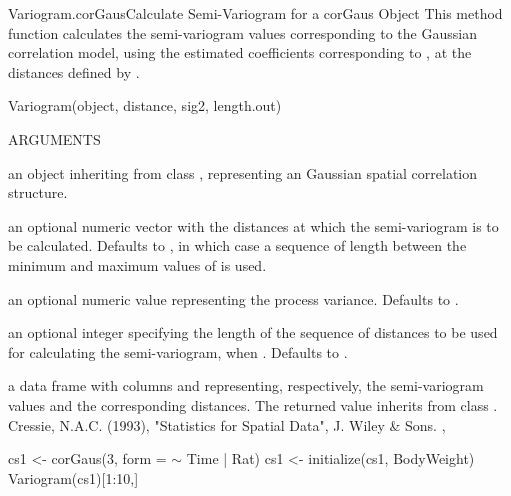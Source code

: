 \documentclass[pdftex]{article} \usepackage{url,graphicx}
\renewcommand{\Twiddle}{\mbox{\(\sim\)}}
\begin{document}
\begin{Helpfile}{Variogram.corGaus}{Calculate Semi-Variogram for a corGaus Object}
This method function calculates the semi-variogram values
corresponding to the Gaussian correlation model, using the estimated
coefficients corresponding to , at the distances defined
by .
\begin{Example}
Variogram(object, distance, sig2, length.out)
\end{Example}
\begin{Argument}{ARGUMENTS}
\item[\Co{object:}]
an object inheriting from class ,
representing an Gaussian spatial correlation structure.
\item[\Co{distance:}]
an optional numeric vector with the distances at
which the semi-variogram is to be calculated. Defaults to
, in which case a sequence of length 
between the minimum and maximum values of
 is used.
\item[\Co{sig2:}]
an optional numeric value representing the process
variance. Defaults to .
\item[\Co{length.out:}]
an optional integer specifying the length of the
sequence of distances to be used for calculating the semi-variogram,
when . Defaults to .
\end{Argument}
a data frame with columns  and  representing,
respectively, the semi-variogram values and the corresponding
distances. The returned value inherits from class .
Cressie, N.A.C. (1993), "Statistics for Spatial Data", J. Wiley \& Sons.
, 
\need 15pt
\vspace{-16pt}
\begin{Example}
cs1 <- corGaus(3, form = {\Twiddle} Time | Rat)
cs1 <- initialize(cs1, BodyWeight)
Variogram(cs1)[1:10,]
\end{Example}
\end{Helpfile}
\end{document}
